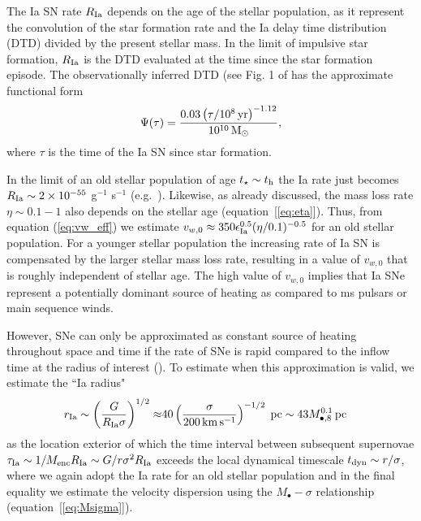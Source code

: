 \documentclass[usenatbib,fleqn]{mn2e}
\newcommand{\RateIa}{R_{\rm Ia}}
\begin{document}
The Ia SN rate $\RateIa$ depends on the age of the stellar population, as it represent the convolution of the star formation rate and the Ia delay time distribution (DTD) divided by the present stellar mass.  In the limit of impulsive star formation, $\RateIa$ is the DTD evaluated at the time since the star formation episode.  The observationally inferred DTD (see Fig. 1 of \citet{MaozMannucci+:2012a} has the approximate functional form
\begin{align}
    \Psi(\tau)=\frac{0.03
      \left(\tau/10^8\,{\rm yr}\right)^{-1.12}}{10^{10} \,{\rm M_\odot}},
  \end{align}
where $\tau$ is the time of the Ia SN since star formation.  

In the limit of an old stellar population of age $t_{\star} \sim
t_{\rm h}$ the Ia rate just becomes $R_{\rm Ia} \sim 2\times 10^{-55}
$ g$^{-1}$ s$^{-1}$ (e.g.~\citealt{Scannapieco&Bildsten05}).
Likewise, as already discussed, the mass loss rate $\eta \sim 0.1-1$
also depends on the stellar age (equation~[\ref{eq:eta}]).  Thus, from
equation (\ref{eq:vw_eff}) we estimate $v_{w,0} \approx
350\epsilon_{\rm Ia}^{0.5}(\eta/0.1)^{-0.5}$ for an old stellar
population.  For a younger stellar population the increasing rate of
Ia SN is compensated by the larger stellar mass loss rate, resulting
in a value of $v_{w,0}$ that is roughly independent of stellar age.
The high value of $v_{w,0}$ implies that Ia SNe represent a
potentially dominant source of heating as compared to ms pulsars or
main sequence winds.

However, SNe can only be approximated as constant source of heating
throughout space and time if the rate of SNe is rapid compared to the
inflow time at the radius of interest
(\citealt{ShcherbakovWong+:2014a}).  To estimate when this
approximation is valid, we estimate the ``Ia radius"
\begin{align}
r_{\rm Ia} \sim \left(\frac{G}{R_{\rm Ia}\sigma}\right)^{1/2} \approx
&40\left(\frac{\sigma}{200\,{\rm km\,s^{-1}}}\right)^{-1/2} \; {\rm pc}\sim 43 M_{\bullet,8}^{0.1}\,{\rm pc} 
\label{eq:rIa}
\end{align}
as the location exterior of which the time interval between subsequent
supernovae $\tau_{\rm Ia} \sim 1/M_{\rm enc}R_{\rm Ia} \sim
G/r\sigma^{2}R_{\rm Ia}$ exceeds the local dynamical timescale $t_{\rm
  dyn} \sim r/\sigma$, where we again adopt the Ia rate for an old
stellar population and in the final equality we estimate the velocity
dispersion using the $M_{\bullet}-\sigma$ relationship
(equation~[\ref{eq:Msigma}]).
\end{document}
